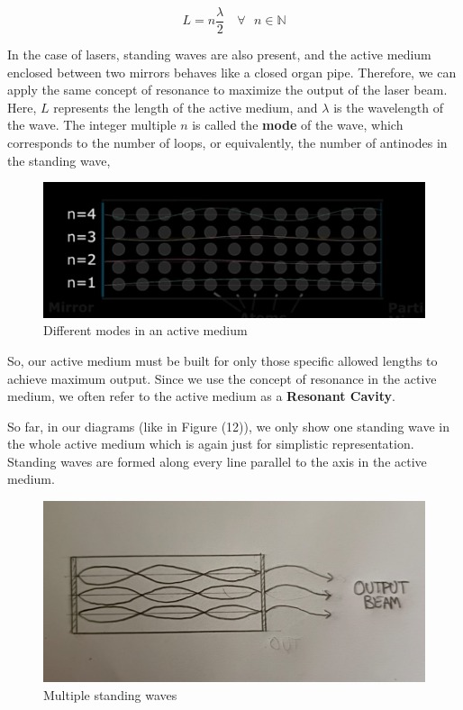 \documentclass[12pt]{article}
\begin{document}
\begin{equation}
    L = n\frac{\lambda}{2} \quad \forall \text{  } n \in \mathbb{N}
\end{equation} \vspace{.2cm}


In the case of lasers, standing waves are also present, and the active medium enclosed between two mirrors behaves like a closed organ pipe. Therefore, we can apply the same concept of resonance to maximize the output of the laser beam. Here, \( L \) represents the length of the active medium, and \( \lambda \) is the wavelength of the wave. The integer multiple \( n \) is called the \textbf{mode} of the wave, which corresponds to the number of loops, or equivalently, the number of antinodes in the standing wave,

\begin{figure}[H]
    \centering
    \includegraphics[scale=.8]{./img/15_modes.png}
    \caption{Different modes in an active medium}
\end{figure} \vspace{.2cm}

So, our active medium must be built for only those specific allowed lengths to achieve maximum output. Since we use the concept of resonance in the active medium, we often refer to the active medium as a \textbf{Resonant Cavity}. \vspace{.2cm}

So far, in our diagrams (like in Figure (12)), we only show one standing wave in the whole active medium which is again just for simplistic representation. Standing waves are formed along every line parallel to the axis in the active medium.

\begin{figure}[H]
    \centering
    \includegraphics[scale=.5]{./img/16_mult_standing_waves.png}
    \caption{Multiple standing waves}
\end{figure}
\end{document}
